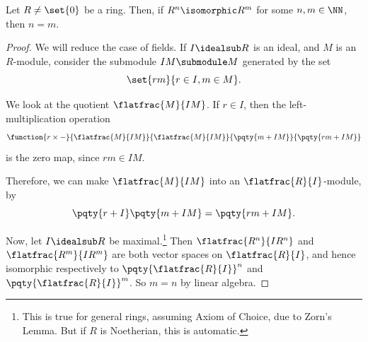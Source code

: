 \begin{proposition}
    \label{prop:isomorphism-modules-rn-rm}%
    Let \(R \neq \set{0}\) be a ring. Then, if \(R^n \isomorphic R^m\) for some \(n, m \in \NN\), then \(n = m\).
\end{proposition}

\begin{proof}
    We will reduce the case of fields. If \(I \idealsub R\) is an ideal, and \(M\) is an \(R\)-module, consider the submodule \(IM \submodule M\) generated by the set
    \[
        \set{rm}{r \in I, m \in M}.
    \]
    
    We look at the quotient \(\flatfrac{M}{IM}\). If \(r \in I\), then the left-multiplication operation
    \[
        \function{r \times -}{\flatfrac{M}{IM}}{\flatfrac{M}{IM}}{\pqty{m + IM}}{\pqty{rm + IM}}
    \]
    is the zero map, since \(rm \in IM\).

    Therefore, we can make \(\flatfrac{M}{IM}\) into an \(\flatfrac{R}{I}\)-module, by
    \[
        \pqty{r + I} \pqty{m + IM} = \pqty{rm + IM}.
    \]

    Now, let \(I \idealsub R\) be maximal.\footnote{This is true for general rings, assuming Axiom of Choice, due to Zorn's Lemma. But if \(R\) is Noetherian, this is automatic.} Then \(\flatfrac{R^n}{I R^n}\) and \(\flatfrac{R^m}{I R^m}\) are both vector spaces on \(\flatfrac{R}{I}\), and hence isomorphic respectively to \(\pqty{\flatfrac{R}{I}}^n\) and \(\pqty{\flatfrac{R}{I}}^m\). So \(m = n\) by linear algebra.
\end{proof}